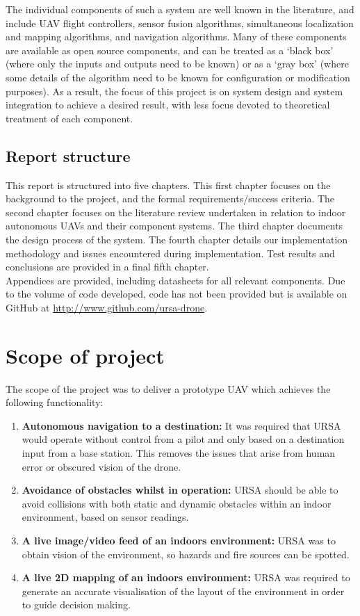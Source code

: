 \documentclass[capstone_report.tex]{subfiles}
\begin{document}
The individual components of such a system are well known in the literature, and include UAV flight controllers, sensor fusion algorithms, simultaneous localization and mapping algorithms, and navigation algorithms. Many of these components are available as open source components, and can be treated as a `black box' (where only the inputs and outputs need to be known) or as a `gray box' (where some details of the algorithm need to be known for configuration or modification purposes). As a result, the focus of this project is on system design and system integration to achieve a desired result, with less focus devoted to theoretical treatment of each component.\\

\subsection{Report structure}
This report is structured into five chapters. This first chapter focuses on the background to the project, and the formal requirements/success criteria. The second chapter focuses on the literature review undertaken in relation to indoor autonomous UAVs and their component systems. The third chapter documents the design process of the system. The fourth chapter details our implementation methodology and issues encountered during implementation. Test results and conclusions are provided in a final fifth chapter. \\

Appendices are provided, including datasheets for all relevant components. Due to the volume of code developed, code has not been provided but is available on GitHub at \url{http://www.github.com/ursa-drone}.

\section{Scope of project}
The scope of the project was to deliver a prototype UAV which achieves the following functionality:
\begin{enumerate}
	\item \textbf{Autonomous navigation to a destination:} It was required that URSA would operate without control from a pilot and only based on a destination input from a base station. This removes the issues that arise from human error or obscured vision of the drone.
	\item \textbf{Avoidance of obstacles whilst in operation:} URSA should be able to avoid collisions with both static and dynamic obstacles within an indoor environment, based on sensor readings.
	\item \textbf{A live image/video feed of an indoors environment:} URSA was to obtain vision of the environment, so hazards and fire sources can be spotted.
	\item \textbf{A live 2D mapping of an indoors environment:} URSA was required to generate an accurate visualisation of the layout of the environment in order to guide decision making.
\end{enumerate}
\end{document}
